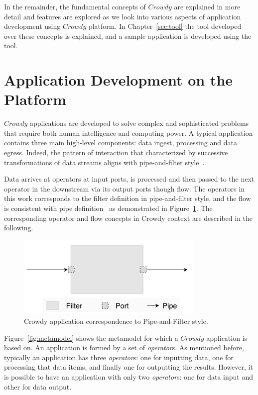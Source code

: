 In the remainder, the fundamental concepts of $Crowdy$ are explained 
in more detail and features are explored as we look into various aspects of application 
development using $Crowdy$ platform. In Chapter~\ref{sec:tool} the tool developed over 
these concepts is explained, and a sample application is developed using the tool.




\section{Application Development on the Platform}
\label{chap:appdevelopment}
$Crowdy$ applications are developed to solve complex and sophisticated problems 
that require both human intelligence and computing power. A typical application contains 
three main high-level components: data ingest, processing and data egress. Indeed, 
the pattern of interaction that characterized by successive transformations of data streams 
aligns with pipe-and-filter style~\cite{Clements}.

Data arrives at operators at input ports, is processed and then passed to the next operator 
in the downstream via its output ports though flow. The operators in this work corresponds 
to the filter definition in pipe-and-filter style, and the flow is consistent with pipe 
definition~\cite{Clements} as demonstrated in Figure~\ref{fig:pipefilter}. The corresponding 
operator and flow concepts in Crowdy context are described in the following. 

\begin{figure}[ht]
	\centering
	\includegraphics[width=0.8\textwidth]{figures/architecture/PipeFilter.png}
	\caption{Crowdy application correspondence to Pipe-and-Filter style.}
	\label{fig:pipefilter}
\end{figure}

Figure~\ref{fig:metamodel} shows the metamodel for which a $Crowdy$ application is 
based on. An application is formed by a set of \textit{operator}s. As mentioned before, 
typically an application has three \textit{operator}s: one for inputting data, one for processing 
that data items, and finally one for outputting the results. However, it is possible to 
have an application with only two \textit{operator}s: one for data input and other for data 
output.

